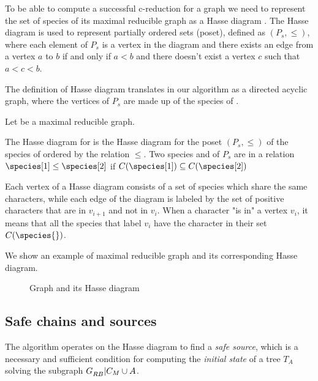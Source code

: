 To be able to compute a successful c-reduction for a graph \grb{} we need to represent the set of species of its maximal reducible graph \gm{} as a Hasse diagram \cite{PPPptime2016}.
The Hasse diagram is used to represent partially ordered sets (poset), defined as $(P_{s}, \leq)$, where each element of $P_{s}$ is a vertex in the diagram and there exists an edge from a vertex $a$ to $b$ if and only if $a < b$ and there doesn't exist a vertex $c$ such that $a < c < b$.

The definition of Hasse diagram translates in our algorithm as a directed acyclic graph, where the vertices of $P_{s}$ are made up of the species of \gm{}.

\begin{definition}\label{definition:hasse-diagram}
  Let \gm{} be a maximal reducible graph.

  The Hasse diagram \hasse{} for \gm{} is the Hasse diagram for the poset $(P_{s}, \leq)$ of the species of \gm{} ordered by the relation $\leq$.
  Two species \species[1] and \species[2] of $P_{s}$ are in a relation $\species[1] \leq \species[2]$ if $C(\species[1]) \subseteq C(\species[2])$
\end{definition}

Each vertex of a Hasse diagram \hasse{} consists of a set of species which share the same characters, while each edge  of the diagram is labeled by the set of positive characters that are in $v_{i+1}$ and not in $v_{i}$.
When a character \character{} "is in" a vertex $v_{i}$, it means that all the species that label $v_{i}$ have the character \character{} in their set $C(\species{})$.

We show an example of maximal reducible graph and its corresponding Hasse diagram.

\begin{figure}[H]
  

  \caption{Graph \gm{} and its Hasse diagram \hasse{}}\label{figure:4}
\end{figure}

\subsection{Safe chains and sources}\label{section:safe-chains-sources}

The algorithm operates on the Hasse diagram to find a \emph{safe source}, which is a necessary and sufficient condition for computing the \emph{initial state} of a tree $T_{A}$ solving the subgraph $G_{RB}^{}{}|C_{M}{}{} \cup A$.

